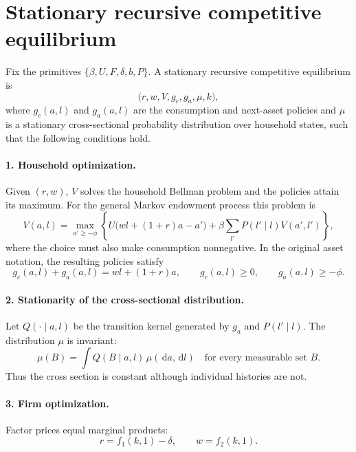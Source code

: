 \documentclass[11pt]{article}
\theoremstyle{propertystyle}
\newcommand{\1}{\mathbf{1}}
\newcommand{\dd}{\,\mathrm{d}}
\begin{document}
\section{Stationary recursive competitive equilibrium}
\label{sec:equilibrium}

Fix the primitives $\{\beta,U,F,\delta,b,P\}$.  A stationary recursive
competitive equilibrium is
\[
  \bigl(r,w,V,g_c,g_a,\mu,k\bigr),
\]
where $g_c(a,l)$ and $g_a(a,l)$ are the consumption and next-asset policies and
$\mu$ is a stationary cross-sectional probability distribution over household
states, such that the following conditions hold.

\paragraph{1. Household optimization.}
Given $(r,w)$, $V$ solves the household Bellman problem and the policies attain
its maximum.  For the general Markov endowment process this problem is
\begin{equation}
  V(a,l)=
  \max_{a'\geq-\phi}
  \left\{
    U\bigl(wl+(1+r)a-a'\bigr)
    +\beta\sum_{l'}P(l'\mid l)V(a',l')
  \right\},
  \label{eq:markov-bellman}
\end{equation}
where the choice must also make consumption nonnegative.  In the original
asset notation, the resulting policies satisfy
\begin{equation}
  g_c(a,l)+g_a(a,l)=wl+(1+r)a,
  \qquad g_c(a,l)\geq0,\qquad g_a(a,l)\geq-\phi.
  \label{eq:hh-opt}
\end{equation}

\paragraph{2. Stationarity of the cross-sectional distribution.}
Let $Q(\cdot\mid a,l)$ be the transition kernel generated by $g_a$ and
$P(l'\mid l)$.  The distribution $\mu$ is invariant:
\begin{equation}
  \mu(B)=\int Q(B\mid a,l)\,\mu(\dd a,\dd l)
  \quad\text{for every measurable set }B.
  \label{eq:invariant}
\end{equation}
Thus the cross section is constant although individual histories are not.

\paragraph{3. Firm optimization.}
Factor prices equal marginal products:
\begin{equation}
  r=f_1(k,1)-\delta,
  \qquad w=f_2(k,1).
  \label{eq:firm-equilibrium}
\end{equation}
\end{document}
